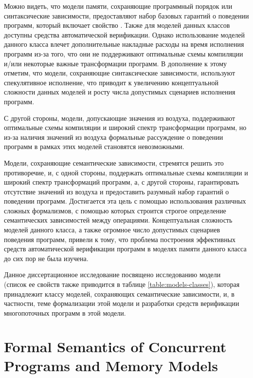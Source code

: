 

Можно видеть, что модели памяти,
сохраняющие программный порядок или синтаксические зависимости, 
предоставляют набор базовых гарантий о поведении программ, 
который включает свойство \DRF. Также для моделей данных классов 
доступны средства автоматической верификации.
Однако использование моделей данного класса влечет 
дополнительные накладные расходы на время исполнения программ 
из-за того, что они не поддерживают оптимальные схемы компиляции
и/или некоторые важные трансформации программ.
В дополнение к этому отметим, что модели,
сохраняющие синтаксические зависимости, используют спекулятивное исполнение, 
что приводит к увеличению концептуальной сложности данных моделей 
и росту числа допустимых сценариев исполнения программ. 

С другой стороны, модели, допускающие значения из воздуха, 
поддерживают оптимальные схемы компиляции и широкий спектр 
трансформации программ, но из-за наличия значений из воздуха 
формальные рассуждение о поведении программ в рамках этих моделей становятся невозможными. 

Модели, сохраняющие семантические зависимости, стремятся 
решить это противоречие, и, с одной стороны, 
поддержать оптимальные схемы компиляции и широкий спектр 
трансформаций программ, а, с другой стороны, 
гарантировать отсутствие значений из воздуха 
и предоставить разумный набор гарантий о поведении программ.
Достигается эта цель с помощью использования различных 
сложных формализмов, с помощью которых строится строгое определение
семантических зависимостей между операциями.
Концептуальная сложность моделей данного класса, 
а также огромное число допустимых сценариев поведения программ,
привели к тому, что проблема построения эффективных 
средств автоматической верификации программ в 
моделях памяти данного класса до сих пор не была изучена. 

Данное диссертационное исследование посвящено исследованию модели \Wkm~\cite{Chakraborty-Vafeiadis:POPL19}
(список ее свойств также приводится в таблице \ref{table:models-classes}), 
которая принадлежит классу моделей, сохраняющих семантические зависимости,
и, в частности, теме формализации этой модели и разработки средств верификации
многопоточных программ в этой модели. 

\section{Formal Semantics of Concurrent Programs and Memory Models}

